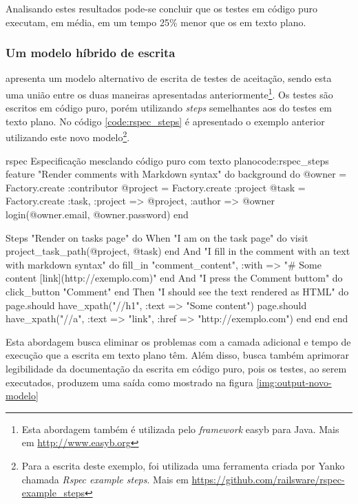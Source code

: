 Analisando estes resultados pode-se concluir que os testes em código puro executam, em média, em um tempo 25\% menor que os em texto plano.


\subsubsection{Um modelo híbrido de escrita} %
\label{ssub:um_modelo_hibrido_de_escrita}

 apresenta um modelo alternativo de escrita de testes de aceitação, sendo esta uma união entre os duas maneiras apresentadas anteriormente\footnote{Esta abordagem também é utilizada pelo \textit{framework} easyb para Java. Mais em \url{http://www.easyb.org}}. Os testes são escritos em código puro, porém utilizando \textit{steps} semelhantes aos do testes em texto plano. No código \ref{code:rspec_steps} é apresentado o exemplo anterior utilizando este novo modelo\footnote{Para a escrita deste exemplo, foi utilizada uma ferramenta criada por Yanko chamada \textit{Rspec example steps}. Mais em \url{https://github.com/railsware/rspec-example_steps}}.

\begin{mycode}{rspec}%
{Especificação mesclando código puro com texto plano}{code:rspec_steps}
feature "Render comments with Markdown syntax" do
  background do
    @owner = Factory.create :contributor
    @project = Factory.create :project
    @task = Factory.create :task, :project => @project, :author => @owner
    login(@owner.email, @owner.password)
  end

  Steps "Render on tasks page" do
    When "I am on the task page" do
      visit project_task_path(@project, @task)
    end
    And "I fill in the comment with an text with markdown syntax" do
      fill_in "comment_content", :with => "# Some content [link](http://exemplo.com)"
    end
    And "I press the Comment buttom" do
      click_button "Comment"
    end
    Then "I should see the text rendered as HTML" do
      page.should have_xpath("//h1", :text => "Some content")
      page.should have_xpath("//a", :text => "link", :href => "http://exemplo.com")
    end
  end
end
\end{mycode}

Esta abordagem busca eliminar os problemas com a camada adicional e tempo de execução que a escrita em texto plano têm. Além disso, busca também aprimorar legibilidade da documentação da escrita em código puro, pois os testes, ao serem executados, produzem uma saída como mostrado na figura \ref{img:output-novo-modelo}

